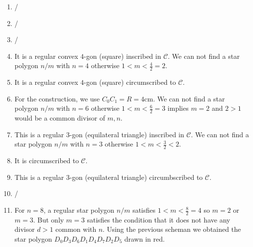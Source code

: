 \begin{enumerate}
\item /
\item /
\item /
\item It is a regular convex $4$-gon (square) inscribed in $\mathcal C$.
  We can not find a star
  polygon ${n/m}$ with $n=4$ otherwise $1 < m < \frac{4}{2}=2$.
\item It is a regular convex $4$-gon (square) circumscribed to $\mathcal C$.
\item For the construction, we use $C_0C_1 = R = 4\text{cm}$.
  We can not find a star
  polygon ${n/m}$ with $n=6$ otherwise
  $1 < m < \frac{6}{2}=3$ implies $m = 2$ and $2 > 1$ would be a common
  divisor of $m,n$.
\item This is a regular $3$-gon (equilateral triangle) inscribed in
  $\mathcal C$.
  We can not find a star
  polygon ${n/m}$ with $n=3$ otherwise $1 < m < \frac{3}{2} < 2$.
\item It is circumscribed to $\mathcal C$.
\item This is a regular $3$-gon (equilateral triangle) circumbscribed to
  $\mathcal C$.
\item /
\item For $n=8$, a regular star polygon ${n/m}$ satisfies
  $1 < m < \frac{8}{2} = 4$ so $m=2$ or $m=3$. But only $m=3$ satisfies the
  condition that it does not have any divisor $d > 1$ common with $n$.
  Using the previous scheman we obtained the star polygon
  $D_0D_3D_6D_1D_4D_7D_2D_5$ drawn in red.
  \begin{center}
\end{center}
\end{enumerate}

